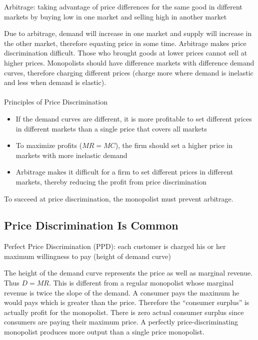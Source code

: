 \documentclass[12pt]{article}
\begin{document}
\begin{definition} Arbitrage: taking advantage of price differences for the same good in different markets by buying low in one market and selling high in another market \end{definition}
Due to arbitrage, demand will increase in one market and supply will increase in the other market, therefore equating price in some time. Arbitrage makes price discrimination difficult. Those who brought goods at lower prices cannot sell at higher prices. Monopolists should have difference markets with difference demand curves, therefore charging different prices (charge more where demand is inelastic and less when demand is elastic).  \\~\\
Principles of Price Discrimination \begin{itemize} 
\item If the demand curves are different, it is more profitable to set different prices in different markets than a single price that covers all markets 
\item To maximize profits ($MR = MC$), the firm should set a higher price in markets with more inelastic demand 
\item Arbitrage makes it difficult for a firm to set different prices in different markets, thereby reducing the profit from price discrimination \end{itemize} 
To succeed at price discrimination, the monopolist must prevent arbitrage. 


\subsection{Price Discrimination Is Common}
\begin{definition} Perfect Price Discrimination (PPD): each customer is charged his or her maximum willingness to pay (height of demand curve) \end{definition}
The height of the demand curve represents the price as well as marginal revenue. Thus $D = MR$. This is different from a regular monopolist whose marginal revenue is twice the slope of the demand. A consumer pays the maximum he would pays which is greater than the price. Therefore the ``consumer surplus'' is actually profit for the monopolist. There is zero actual consumer surplus since consumers are paying their maximum price. 
A perfectly price-discriminating monopolist produces more output than a single price monopolist. 
\end{document}
